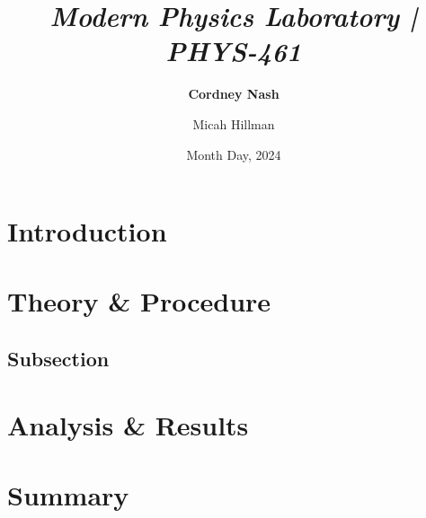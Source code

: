 \documentclass[a4paper,12pt,english]{all-in-one} %
\title{{\large\textit{Modern Physics Laboratory | PHYS-461}}\\[0.5cm]{\Huge\color{gray}\textsc{\@docsubtitle}}}
\author{\textbf{Cordney Nash}  \and Micah Hillman  }
\date{Month Day, 2024}
\begin{document}
\begin{titlepage}
\maketitle\vfill
\end{titlepage}
\newpage


\section*{Introduction}
\lipsum[1]


\begin{multicols}{2}

\section*{Theory \& Procedure}

    \subsection*{Subsection}
    \lipsum[4-8] 
    
\section*{Analysis \& Results}
    \lipsum[10-13]

\end{multicols}

\section*{Summary}
        \lipsum[14]
        \lipsum[15]
\end{document}
